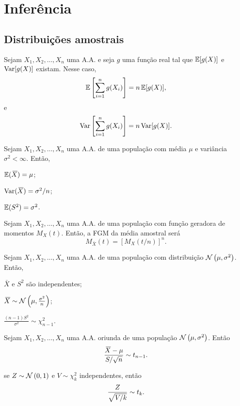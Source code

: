 
\chapter{Inferência}


\section{Distribuições amostrais}

\begin{theorem}
	Sejam $X_1, X_2, \ldots, X_n$ uma A.A. e seja $g$ uma função real tal que $\operatorname{\mathbb{E}}[g(X)]$ e $\operatorname{Var}[g(X)]$ existam. Nesse caso,
	\[
	\operatorname{\mathbb{E}}\left[\sum_{i=1}^{n} g(X_i)\right] = n\operatorname{\mathbb{E}}[g(X)],
	\]
	e
	\[
	\operatorname{Var}\left[\sum_{i=1}^{n} g(X_i)\right] = n\operatorname{Var}[g(X)].
	\]
\end{theorem}

\begin{theorem}
	Sejam $X_1, X_2, \ldots, X_n$ uma A.A. de uma população com média $\mu$ e variância $\sigma^2 < \infty$. Então,
	\begin{outline}[enumerate]
		\1 $\operatorname{\mathbb{E}}(\,\overline{\!{X}}) = \mu$;
		
		\1 $\operatorname{Var}(\,\overline{\!{X}}) = \sigma^2/n$;
		
		\1 $\operatorname{\mathbb{E}}(S^2) = \sigma^2$.
	\end{outline}
\end{theorem}

\begin{theorem}
	Sejam $X_1, X_2, \ldots, X_n$ uma A.A. de uma população com função geradora de momentos $M_X(t)$. Então, a FGM da média amostral será
	\[
	M_{\bar{X}}(t) = [M_X(t/n)]^n.
	\]
\end{theorem}

\begin{theorem}[A.A. da Normal]
	Sejam $X_1, X_2, \ldots, X_n$ uma A.A. de uma população com distribuição $\normdist{\mu, \sigma^2}$. Então,
	\begin{outline}[enumerate]
		\1 $\bar{X}$ e $S^2$ são independentes;
		
		\1 $\bar{X} \sim \normdist{\mu, \frac{\sigma^2}{n}}$;
		
		\1 $\frac{(n-1)S^2}{\sigma^2} \sim \chi_{n-1}^2$.
	\end{outline}
\end{theorem}

\begin{theorem}[A.A. da t-Student]
	Sejam $X_1, X_2, \ldots, X_n$ uma A.A. oriunda de uma população $\normdist{\mu, \sigma^2}$. Então
	\[
	\frac{\,\overline{\!{X}} - \mu}{S/\sqrt{n}} \sim t_{n-1}.
	\]
	\begin{note}
		se $Z \sim \normdist{0,1}$ e $V \sim \chi_k^2$ independentes, então
		\[
		\frac{Z}{\sqrt{V/k}} \sim t_{k}.
		\]
	\end{note}
\end{theorem}

